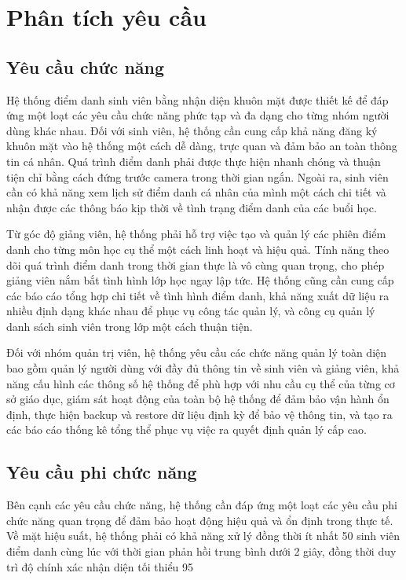\documentclass[12pt,a4paper]{report}
\begin{document}
\section{Phân tích yêu cầu}
\subsection{Yêu cầu chức năng}
Hệ thống điểm danh sinh viên bằng nhận diện khuôn mặt được thiết kế để đáp ứng một loạt các yêu cầu chức năng phức tạp và đa dạng cho từng nhóm người dùng khác nhau. Đối với sinh viên, hệ thống cần cung cấp khả năng đăng ký khuôn mặt vào hệ thống một cách dễ dàng, trực quan và đảm bảo an toàn thông tin cá nhân. Quá trình điểm danh phải được thực hiện nhanh chóng và thuận tiện chỉ bằng cách đứng trước camera trong thời gian ngắn. Ngoài ra, sinh viên cần có khả năng xem lịch sử điểm danh cá nhân của mình một cách chi tiết và nhận được các thông báo kịp thời về tình trạng điểm danh của các buổi học.

Từ góc độ giảng viên, hệ thống phải hỗ trợ việc tạo và quản lý các phiên điểm danh cho từng môn học cụ thể một cách linh hoạt và hiệu quả. Tính năng theo dõi quá trình điểm danh trong thời gian thực là vô cùng quan trọng, cho phép giảng viên nắm bắt tình hình lớp học ngay lập tức. Hệ thống cũng cần cung cấp các báo cáo tổng hợp chi tiết về tình hình điểm danh, khả năng xuất dữ liệu ra nhiều định dạng khác nhau để phục vụ công tác quản lý, và công cụ quản lý danh sách sinh viên trong lớp một cách thuận tiện.

Đối với nhóm quản trị viên, hệ thống yêu cầu các chức năng quản lý toàn diện bao gồm quản lý người dùng với đầy đủ thông tin về sinh viên và giảng viên, khả năng cấu hình các thông số hệ thống để phù hợp với nhu cầu cụ thể của từng cơ sở giáo dục, giám sát hoạt động của toàn bộ hệ thống để đảm bảo vận hành ổn định, thực hiện backup và restore dữ liệu định kỳ để bảo vệ thông tin, và tạo ra các báo cáo thống kê tổng thể phục vụ việc ra quyết định quản lý cấp cao.

\subsection{Yêu cầu phi chức năng}
Bên cạnh các yêu cầu chức năng, hệ thống cần đáp ứng một loạt các yêu cầu phi chức năng quan trọng để đảm bảo hoạt động hiệu quả và ổn định trong thực tế. Về mặt hiệu suất, hệ thống phải có khả năng xử lý đồng thời ít nhất 50 sinh viên điểm danh cùng lúc với thời gian phản hồi trung bình dưới 2 giây, đồng thời duy trì độ chính xác nhận diện tối thiểu 95%
\end{document}
